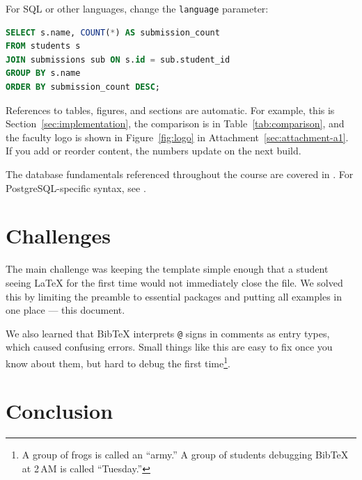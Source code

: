 \documentclass[11pt, a4paper]{article}
\begin{document}
For SQL or other languages, change the \texttt{language} parameter:

\begin{lstlisting}[language=SQL, caption={Example SQL query}]
SELECT s.name, COUNT(*) AS submission_count
FROM students s
JOIN submissions sub ON s.id = sub.student_id
GROUP BY s.name
ORDER BY submission_count DESC;
\end{lstlisting}


References to tables, figures, and sections are automatic. For example,
this is Section~\ref{sec:implementation}, the comparison is in
Table~\ref{tab:comparison}, and the faculty logo is shown in
Figure~\ref{fig:logo} in Attachment~\ref{sec:attachment-a1}.
If you add or reorder content, the numbers update on the next build.


The database fundamentals referenced throughout the course are covered
in \cite{elmasri2016}. For PostgreSQL-specific syntax, see
\cite{postgresql-docs}.


\newpage
\section{Challenges}
\label{sec:challenges}

The main challenge was keeping the template simple enough that a student
seeing \LaTeX{} for the first time would not immediately close the file.
We solved this by limiting the preamble to essential packages and
putting all examples in one place --- this document.

We also learned that BibTeX interprets \texttt{@} signs in comments as
entry types, which caused confusing errors. Small things like this are
easy to fix once you know about them, but hard to debug the first time\footnote{A
group of frogs is called an ``army.'' A group of students debugging BibTeX at
2\,AM is called ``Tuesday.''}.


\newpage
\section{Conclusion}
\label{sec:conclusion}
\end{document}
